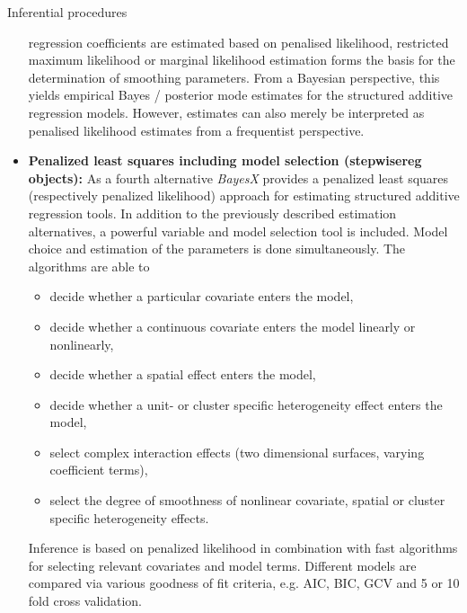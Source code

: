 \begin{stanza}{Inferential procedures}
\begin{itemize}
    regression coefficients are estimated based on penalised likelihood, restricted maximum likelihood or marginal
    likelihood estimation forms the basis for the determination of smoothing parameters. From a Bayesian perspective, this
    yields empirical Bayes / posterior mode estimates for the structured additive regression models. However, estimates can
    also merely be interpreted as penalised likelihood estimates from a frequentist perspective.
\item{\bf \sffamily Penalized least squares including model selection (stepwisereg objects):}
As a fourth alternative {\em BayesX} provides a penalized least squares (respectively penalized likelihood) approach for
estimating structured additive regression tools.
In addition to
the previously described estimation alternatives, a powerful variable and model selection tool is included.  Model choice and estimation of
the parameters is done simultaneously. The algorithms are able to
\begin{itemize}
\item decide whether a particular covariate enters the model,
\item decide whether a continuous covariate enters the model linearly or nonlinearly,
\item decide whether a spatial effect enters the model,
\item decide whether a unit- or cluster specific heterogeneity effect enters the model,
\item select complex interaction effects (two dimensional surfaces, varying coefficient terms),
\item select the degree of smoothness of  nonlinear covariate, spatial or cluster specific heterogeneity effects.
\end{itemize}
Inference is based on penalized likelihood in combination with fast
algorithms for selecting relevant covariates and model terms.
Different models are compared via various goodness of fit criteria,
e.g. AIC, BIC, GCV and 5 or 10 fold cross validation.
\end{itemize}
\end{stanza}


